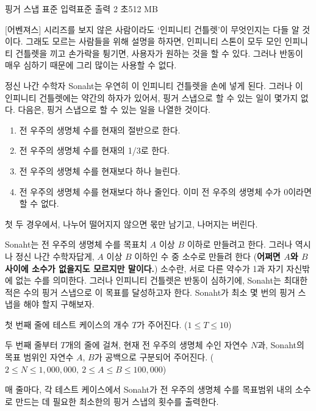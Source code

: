 \begin{problem}{핑거 스냅}
    {표준 입력}{표준 출력}
    {2 초}{512 MB}{}
    
    [어벤져스] 시리즈를 보지 않은 사람이라도 `인피니티 건틀렛'이 무엇인지는 다들 알 것이다. 그래도 모르는 사람들을 위해 설명을 하자면, 인피니티 스톤이 모두 모인 인피니티 건틀렛을 끼고 손가락을 튕기면, 사용자가 원하는 것을 할 수 있다. 그러나 반동이 매우 심하기 때문에 그리 많이는 사용할 수 없다.
    
    정신 나간 수학자 Sonaht는 우연히 이 인피니티 건틀렛을 손에 넣게 된다. 그러나 이 인피니티 건틀렛에는 약간의 하자가 있어서, 핑거 스냅으로 할 수 있는 일이 몇가지 없다. 다음은, 핑거 스냅으로 할 수 있는 일을 나열한 것이다.
    
    \begin{enumerate}
        \item 전 우주의 생명체 수를 현재의 절반으로 한다.
        \item 전 우주의 생명체 수를 현재의 1/3로 한다.
            
        \item 전 우주의 생명체 수를 현재보다 하나 늘린다.
        \item 전 우주의 생명체 수를 현재보다 하나 줄인다. 이미 전 우주의 생명체 수가 0이라면 할 수 없다.
    \end{enumerate}
    첫 두 경우에서, 나누어 떨어지지 않으면 몫만 남기고, 나머지는 버린다.
    
    Sonaht는 전 우주의 생명체 수를 목표치 $ A $ 이상 $ B $ 이하로 만들려고 한다. 그러나 역시나 정신 나간 수학자답게, $ A $ 이상 $ B $ 이하인 수 중 소수로 만들려 한다 (\textbf{어쩌면 $ A $와 $ B $ 사이에 소수가 없을지도 모르지만 말이다.}) 소수란, 서로 다른 약수가 1과 자기 자신밖에 없는 수를 의미한다. 그러나 인피니티 건틀렛은 반동이 심하기에, Sonaht는 최대한 적은 수의 핑거 스냅으로 이 목표를 달성하고자 한다. Sonaht가 최소 몇 번의 핑거 스냅을 해야 할지 구해보자.
    
    \InputFile
    첫 번째 줄에 테스트 케이스의 개수 $ T $가 주어진다. ($ 1 \leq T \leq 10 $)
    
    두 번째 줄부터 $ T $개의 줄에 걸쳐, 현재 전 우주의 생명체 수인 자연수 $ N $과, Sonaht의 목표 범위인 자연수 $ A $, $ B $가 공백으로 구분되어 주어진다. ($ 2 \leq N \leq 1,000,000,\ 2 \leq A \leq B \leq 100,000 $)
    
    \OutputFile
    매 줄마다, 각 테스트 케이스에서 Sonaht가 전 우주의 생명체 수를 목표범위 내의 소수로 만드는 데 필요한 최소한의 핑거 스냅의 횟수를 출력한다.
    

\end{problem}
